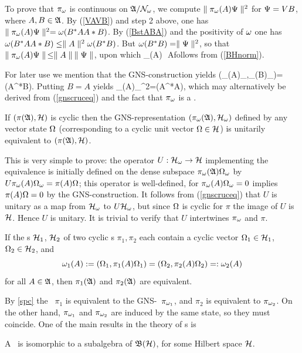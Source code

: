 To prove that $\pi_{\omega}$ is continuous on ${\frak A}/{\cal N}_{\omega}$, we compute
  $\parallel\pi_{\omega}(A)\Psi\parallel^2$ for $\Psi=VB$, where $A,B\in{\frak A}$.  By
  (\ref{VAVB}) and step 2 above, one has
  $\parallel\pi_{\omega}(A)\Psi\parallel^2=\omega(B^*AA*B)$. By (\ref{BstABA}) and the
  positivity of $\omega$ one has $\omega(B^*AA*B)\leq \parallel A\parallel^2
  \omega(B^*B)$. But $\omega(B^*B)=\parallel\Psi\parallel^2$, so that
  $\parallel\pi_{\omega}(A)\Psi\parallel\,\leq \parallel A\parallel\:\parallel\Psi\parallel$, upon which \be \n
  \pi_{\om}(A)\n\,\leq\, \n A\n \ee follows from (\ref{BHnorm}).

For later use we mention that the GNS-construction yields \be
(\pi_{\om}(A)\Om_{\om},\pi_{\om}(B)\Om_{\om})=\om(A^*B). 
\ee Putting $B=A$ yields \be \n\pi_{\om}(A)\Om_{\om}\n^2=\om(A^*A),
 \ee which may alternatively be derived from
(\ref{gnscruceq}) and the fact that $\pi_{\omega}$ is a \rep.
\begin{Proposition}
  If $(\pi({\frak A}),{\cal H})$ is cyclic then the GNS-represen\-ta\-tion
 $(\pi_{\omega}({\frak A}),{\cal H}_{\omega})$ defined by any vector state $\Omega$
 (corresponding to a cyclic unit vector $\Omega\in{\cal H}$) is unitarily
 equivalent to $(\pi({\frak A}),{\cal H})$.
\end{Proposition}

This is very simple to prove: the operator $U:{\cal H}_{\omega}\rightarrow {\cal H}$
implementing the equivalence is initially defined on the dense
subspace $\pi_{\omega}({\frak A})\Omega_{\omega}$ by
$U\pi_{\omega}(A)\Omega_{\omega}=\pi(A)\Omega$; this operator is well-defined, for
$\pi_{\omega}(A)\Omega_{\omega}=0$ implies $\pi(A)\Omega=0$ by the
GNS-construction.  It follows from (\ref{gnscruceq}) that $U$ is
unitary as a map from ${\cal H}_{\omega}$ to $U{\cal H}_{\omega}$, but since $\Omega$ is
cyclic for $\pi$ the image of $U$ is ${\cal H}$. Hence $U$ is unitary.  It
is trivial to verify that $U$ intertwines $\pi_{\omega}$ and $\pi$.  \enp
\begin{Corollary}
If the \Hs s ${\cal H}_1$, ${\cal H}_2$ of two cyclic \rep s $\pi_1,\pi_2$ each
contain a cyclic vector $\Omega_1\in{\cal H}_1$, $\Omega_2\in{\cal H}_2$, and
$$
\omega_1(A):=(\Omega_1,\pi_1(A)\Omega_1)=(\Omega_2,\pi_2(A)\Omega_2)=:\omega_2(A)
$$ for all $A\in{\frak A}$, then $\pi_1({\frak A})$ and $\pi_2({\frak A})$ are equivalent.
\end{Corollary}

By \ref{spc} the \rep\ $\pi_1$ is equivalent to the GNS-\rep\
$\pi_{\omega_1}$, and $\pi_2$ is equivalent to $\pi_{\omega_2}$. On the
other hand, $\pi_{\omega_1}$ and $\pi_{\omega_2}$ are induced by the same
state, so they must coincide.\enp {} One of the main results in the theory of \ca s is
\begin{Theorem}\ll{GNT}
A \ca\ is isomorphic to a subalgebra of ${\frak B}({\cal H})$, for some Hilbert
space ${\cal H}$.
\end{Theorem}

